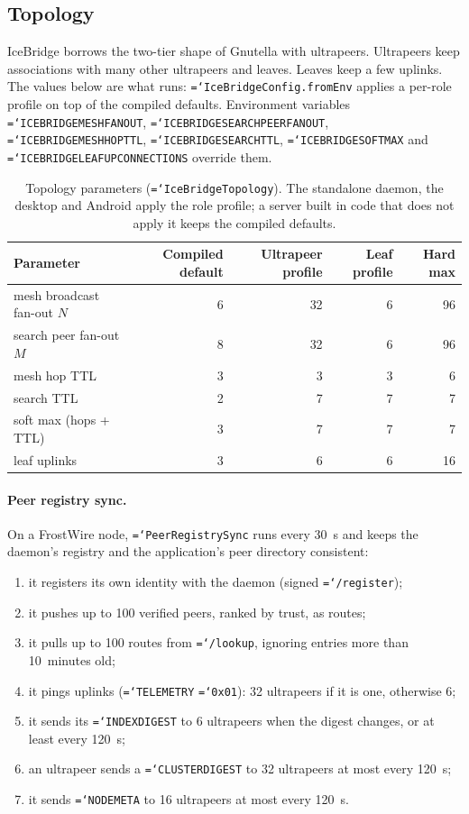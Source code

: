 \documentclass[11pt,a4paper]{article}
\newcommand{\code}[1]{\texttt{\hyphenchar\font=`\-\relax #1}}
\DeclareRobustCommand{\_}{\origunderscore\allowbreak}
\begin{document}
\subsection{Topology}
IceBridge borrows the two-tier shape of Gnutella with ultrapeers. Ultrapeers keep
associations with many other ultrapeers and leaves. Leaves keep a few uplinks. The values
below are what runs: \code{IceBridgeConfig.fromEnv} applies a per-role profile on top of the
compiled defaults. Environment variables \code{ICEBRIDGE\_MESH\_FANOUT},
\code{ICEBRIDGE\_SEARCH\_PEER\_FANOUT}, \code{ICEBRIDGE\_MESH\_HOP\_TTL},
\code{ICEBRIDGE\_SEARCH\_TTL}, \code{ICEBRIDGE\_SOFT\_MAX} and
\code{ICEBRIDGE\_LEAF\_UP\_CONNECTIONS} override them.

\begin{table}[ht]
\centering\small
\begin{tabular}{lrrrr}
\toprule
Parameter & Compiled default & Ultrapeer profile & Leaf profile & Hard max\\
\midrule
mesh broadcast fan-out $N$ & 6 & 32 & 6 & 96\\
search peer fan-out $M$ & 8 & 32 & 6 & 96\\
mesh hop TTL & 3 & 3 & 3 & 6\\
search TTL & 2 & 7 & 7 & 7\\
soft max (hops + TTL) & 3 & 7 & 7 & 7\\
leaf uplinks & 3 & 6 & 6 & 16\\
\bottomrule
\end{tabular}
\caption{Topology parameters (\code{IceBridgeTopology}). The standalone daemon, the desktop
and Android apply the role profile; a server built in code that does not apply it keeps the
compiled defaults.}
\label{tab:topology}
\end{table}

\paragraph{Peer registry sync.} On a FrostWire node, \code{PeerRegistrySync} runs every
30~s and keeps the daemon's registry and the application's peer directory consistent:
\begin{enumerate}
\item it registers its own identity with the daemon (signed \code{/register});
\item it pushes up to 100 verified peers, ranked by trust, as routes;
\item it pulls up to 100 routes from \code{/lookup}, ignoring entries more than 10~minutes old;
\item it pings uplinks (\code{TELEMETRY} \code{0x01}): 32 ultrapeers if it is one, otherwise 6;
\item it sends its \code{INDEX\_DIGEST} to 6 ultrapeers when the digest changes, or at
  least every 120~s;
\item an ultrapeer sends a \code{CLUSTER\_DIGEST} to 32 ultrapeers at most every 120~s;
\item it sends \code{NODE\_META} to 16 ultrapeers at most every 120~s.
\end{enumerate}
\end{document}
